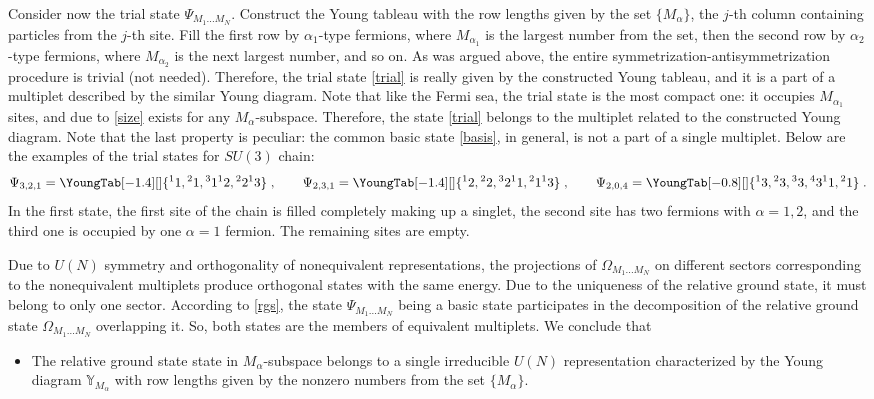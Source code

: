 \documentclass[11pt]{article}
\newcommand{\yn}{\mathbb{Y}}
\begin{document}
Consider now the trial  state $\Psi_{M_1\dots M_N}$.  Construct the Young tableau
with the row lengths given by the set $\{M_\alpha\}$, the $j$-th column containing particles from the $j$-th site.
Fill the f\/irst row by  $\alpha_1$-type fermions, where $M_{\alpha_1}$ is the largest number from the set, then
the second row  by  $\alpha_2$-type fermions, where $M_{\alpha_2}$ is the next largest number,
and so on. As was argued above,  the entire symmetrization-antisymmetrization
procedure is trivial (not needed).
Therefore, the trial state \eqref{trial} is really given  by the constructed Young tableau,
and it is a part of a multiplet described by the similar Young diagram.
Note that like the Fermi sea, the trial state is the most compact one: it occupies $M_{\alpha_1}$ sites,
and due to \eqref{size}  exists for any $M_\alpha$-subspace.
Therefore, the state \eqref{trial} belongs to the multiplet related to the
constructed Young diagram. Note that the last property is peculiar: the
common basic  state \eqref{basis}, in general, is not a part of a single multiplet.
Below are the examples of the trial states for $SU(3)$ chain:
\[
\Psi_{3,2,1} =\YoungTab[-1.4][\normalsize]{ {{}^1 1,{}^2 1,{}^3 1} {{}^1 2,{}^2 2 } {{}^1 3 }}
\;,
\qquad
\Psi_{2,3,1}=\YoungTab[-1.4][\normalsize]{ {{}^1 2,{}^2 2,{}^3 2} {{}^1 1,{}^2 1 } {{}^1 3 }}
\;,
\qquad
\Psi_{2,0,4}=\YoungTab[-0.8][\normalsize]{ {{}^1 3,{}^2 3,{}^3 3, {}^4 3 } {{}^1 1,{}^2 1 } }
\;.
\]
In the f\/irst state, the f\/irst site of the chain is f\/illed completely making up a singlet,
the second site has two fermions with $\alpha=1,2$, and the third one is occupied by one $\alpha=1$ fermion.
The remaining sites are empty.

Due to $U(N)$ symmetry and orthogonality of nonequivalent representations,
the projections of
$\Omega_{M_1\dots M_N}$ on dif\/ferent sectors corresponding to the nonequivalent
multiplets produce orthogonal states with the same energy.
Due to the uniqueness of the relative ground state, it must belong to only one sector.
According to \eqref{rgs}, the state $\Psi_{M_1\dots M_N}$ being a basic state
participates in the decomposition of the relative ground state $\Omega_{M_1\dots M_N}$
overlapping it. So, both states are the members of equivalent multiplets.
We conclude that
\begin{itemize}\itemsep=0pt
\item
The relative ground state state in $M_\alpha$-subspace
belongs to a single irreducible $U(N)$ representation
characterized by the Young diagram $\yn_{M_\alpha}$
with row lengths given by the nonzero numbers from the set $\{M_\alpha\}$.
\end{itemize}
\end{document}
